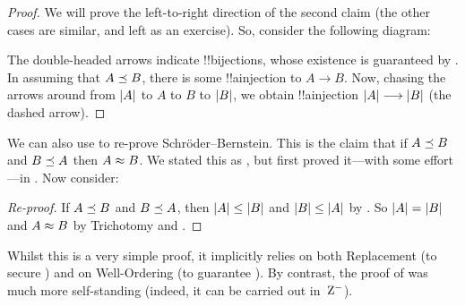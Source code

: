 \documentclass[../../../include/open-logic-section]{subfiles}
\begin{document}
\begin{proof}
We will prove the left-to-right direction of the second claim (the
other cases are similar, and left as an exercise). So, consider the
following diagram:
\begin{center}
\end{center}
The double-headed arrows indicate !!{bijection}s, whose existence is
guaranteed by . In assuming that
$A \preceq B$, there is some !!a{injection} to $A\to B$. Now,
chasing the arrows around from $\left| A \right|$ to $A$ to $B$ to $\left| B \right|$,
we obtain !!a{injection} $\left| A \right| \longrightarrow \left| B \right|$ (the dashed arrow).
\end{proof}\noindent We can also use 
to re-prove Schr\"{o}der--Bernstein. This is the claim that if
$A \preceq B$ and $B \preceq A$ then $A \approx B$. We stated
this as , but first proved
it---with some effort---in .
Now consider:

\begin{proof}[Re-proof]
If $A \preceq B$ and $B \preceq A$, then $\left| A \right| \leq \left| B \right|$
and $\left| B \right| \leq \left| A \right|$ by . So
$\left| A \right| = \left| B \right|$ and $A \approx B$ by Trichotomy and
.
\end{proof}

Whilst this is a very simple proof, it implicitly relies on both
Replacement (to secure
) and on
Well-Ordering (to guarantee ). By
contrast, the proof of  was much
more self-standing (indeed, it can be carried out in~$\mathrm{Z}^{-}$).
\end{document}
